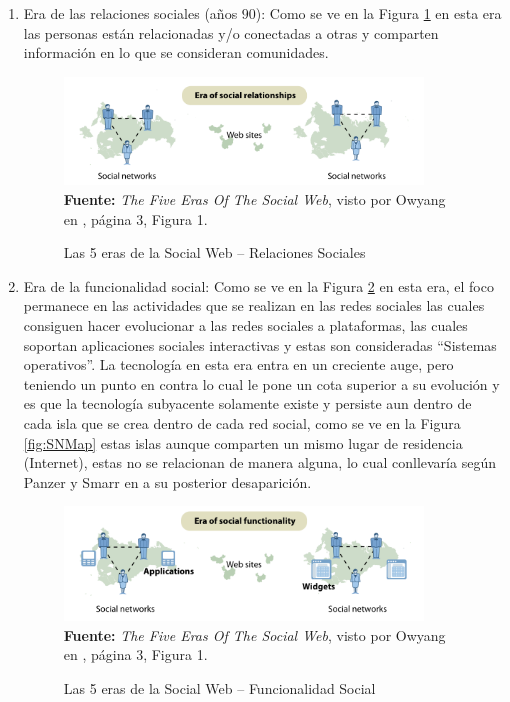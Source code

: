 \documentclass[oneside,12pt,a4paper]{memoir}%
\begin{document}
		\begin{enumerate}
		  \item Era de las relaciones sociales (a\~nos $90$): Como se ve en la Figura
		  \ref{fig:5ErasA} en esta era las personas est\'an relacionadas y/o
		  conectadas a otras y comparten informaci\'on en lo que se consideran comunidades.
		  
		  \begin{figure}[here]
			\centering
			\caption{Las 5 eras de la Social Web -- Relaciones Sociales}
			\includegraphics[width=0.9\textwidth]{figure/fig_5ErasA.png}
			\newline
			\textbf{Fuente:} \textit{The Five Eras Of The Social Web}, visto por Owyang
			en \cite{Forrester2009}, p\'agina 3, Figura 1.
			\label{fig:5ErasA}
		  \end{figure}
		
		  \item Era de la funcionalidad social: Como se ve en la Figura
		  \ref{fig:5ErasB} en esta era, el foco permanece en las actividades que se
		  realizan en las redes sociales las cuales consiguen hacer evolucionar a las
		  redes sociales a plataformas, las cuales soportan aplicaciones sociales
		  interactivas y estas son consideradas ``Sistemas operativos''. La tecnolog\'ia
		  en esta era entra en un creciente auge, pero teniendo un punto en contra lo
		  cual le pone un cota superior a su evoluci\'on y es que la tecnolog\'ia
		  subyacente solamente existe y persiste aun dentro de cada isla que se crea
		  dentro de cada red social, como se ve en la Figura \ref{fig:SNMap} estas
		  islas aunque comparten un mismo lugar de residencia (Internet), estas no se
		  relacionan de manera alguna, lo cual conllevar\'ia seg\'un Panzer y Smarr en
		  \cite{Smarr2010} a su posterior desaparici\'on.
		  
		  \begin{figure}[here]
			\centering
			\caption{Las 5 eras de la Social Web -- Funcionalidad Social}
			\includegraphics[width=0.9\textwidth]{figure/fig_5ErasB.png}
			\newline
			\textbf{Fuente:} \textit{The Five Eras Of The Social Web}, visto por Owyang
			en \cite{Forrester2009}, p\'agina 3, Figura 1.
			\label{fig:5ErasB}
		\end{figure}
		

\end{enumerate}
\end{document}
